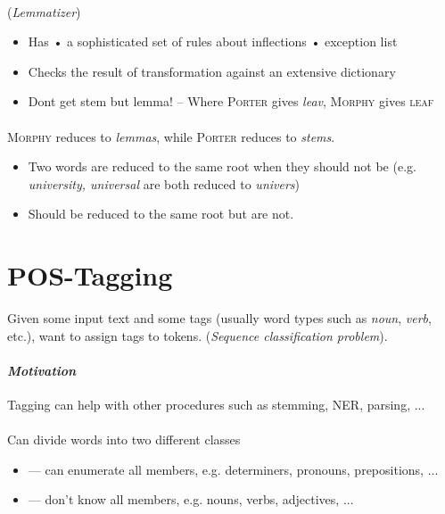 \documentclass[10pt,twocolumn]{article}
\begin{document}
\paragraph{ } (\textit{Lemmatizer})
\begin{itemize}
\item Has  •  a sophisticated set of rules about inflections  • exception list
\item Checks the result of transformation against an extensive dictionary
\item Dont get stem but lemma! -- Where \textsc{Porter} gives \textit{leav},
  \textsc{Morphy} gives \textsc{leaf}
\end{itemize}

\paragraph{} \textsc{Morphy} reduces to \textit{lemmas}, while
\textsc{Porter} reduces to \textit{stems}.

\begin{itemize}
\item \textbf{} Two words are reduced to the same root when
  they should not be (e.g. \textit{university, universal} are both reduced to \textit{univers})
\item \textbf{} Should be reduced to the same root but are not.
\end{itemize}


\section{POS-Tagging}

Given some input text and some tags (usually word types such as \textit{noun},
\textit{verb}, etc.), want to assign tags to tokens. (\textit{Sequence
  classification problem}).

\paragraph{\textit{Motivation}} Tagging can help with other procedures such as
stemming, NER, parsing, ...

\paragraph{} Can divide words into two different classes
\begin{itemize}
  \item \textbf{} --- can enumerate all members, e.g.
    determiners, pronouns, prepositions, ...
\item \textbf{} --- don't know all members, e.g. nouns, verbs,
  adjectives, ...
\end{itemize}
\end{document}
